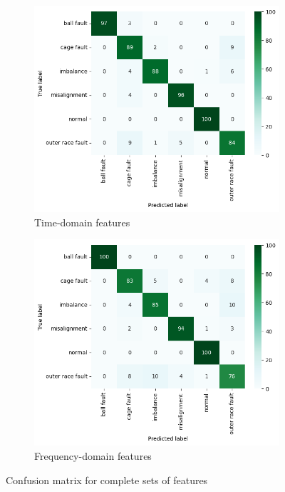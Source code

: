 \begin{figure}[h]
    \centering
    \begin{subfigure}[b]{0.49\textwidth}
        \includegraphics[width=\textwidth]{assets/results/all-features/TD-confusion-matrix.png}
        \caption{Time-domain features}
    \end{subfigure}
    \hfill
    \begin{subfigure}[b]{0.49\textwidth}
        \includegraphics[width=\textwidth]{assets/results/all-features/FD-confusion-matrix.png}
        \caption{Frequency-domain features}
    \end{subfigure}
    \caption{Confusion matrix for complete sets of features}
    \label{fig:evaluation:all-features-confusion-matrix}
\end{figure}

